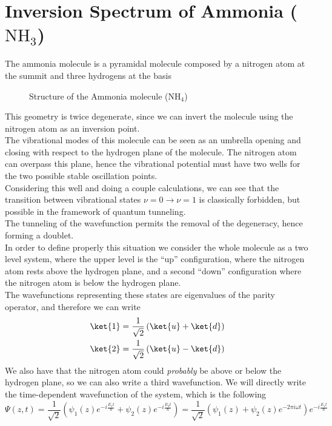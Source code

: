 \documentclass[a4paper, 11pt]{book}
\newcommand{\1}{\opr{\mathds{1}}}
\theoremstyle{plain}
\begin{document}
	\section{Inversion Spectrum of Ammonia ($\mathrm{NH_3}$)}
	The ammonia molecule is a pyramidal molecule composed by a nitrogen atom at the summit and three hydrogens at the basis
	\begin{figure}[H]
		\centering
		\caption{Structure of the Ammonia molecule ($\mathrm{NH_4}$)}
		\label{fig:ammoniamol}
	\end{figure}
	This geometry is twice degenerate, since we can invert the molecule using the nitrogen atom as an inversion point.\\
	The vibrational modes of this molecule can be seen as an umbrella opening and closing with respect to the hydrogen plane of the molecule. The nitrogen atom can overpass this plane, hence the vibrational potential must have two wells for the two possible stable oscillation points.\\
	Considering this well and doing a couple calculations, we can see that the transition between vibrational states $\nu=0\to\nu=1$ is classically forbidden, but possible in the framework of quantum tunneling.\\
	The tunneling of the wavefunction permits the removal of the degeneracy, hence forming a doublet.\\
	In order to define properly this situation we consider the whole molecule as a two level system, where the upper level is the ``up'' configuration, where the nitrogen atom rests above the hydrogen plane, and a second ``down'' configuration where the nitrogen atom is below the hydrogen plane.\\
	The wavefunctions representing these states are eigenvalues of the parity operator, and therefore we can write
	\begin{equation}
		\begin{aligned}
			\ket{1}&=\frac{1}{\sqrt{2}}\left( \ket{u}+\ket{d} \right)\\
			\ket{2}&=\frac{1}{\sqrt{2}}\left( \ket{u}-\ket{d} \right)
		\end{aligned}
		\label{eq:nitrogeninversion}
	\end{equation}
	We also have that the nitrogen atom could \textit{probably} be above or below the hydrogen plane, so we can also write a third wavefunction. We will directly write the time-dependent wavefunction of the system, which is the following
	\begin{equation}
		\Psi(z,t)=\frac{1}{\sqrt{2}}\left( \psi_1(z)e^{-i\frac{E_1t}{\hbar}}+\psi_2(z)e^{-i\frac{E_2t}{\hbar}} \right)=\frac{1}{\sqrt{2}}\left( \psi_1(z)+\psi_2(z)e^{-2\pi i\omega t} \right)e^{-i\frac{E_1t}{\hbar}}
		\label{eq:psibignh3}
	\end{equation}
\end{document}
